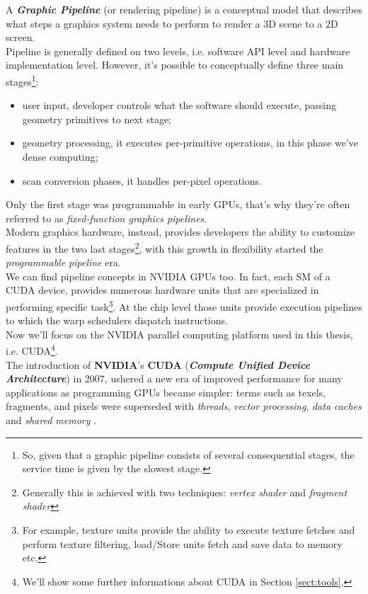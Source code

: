 	A \textit{\textbf{Graphic Pipeline}} (or rendering pipeline) is a conceptual model that describes what steps a graphics system needs to perform to render a 3D scene to a 2D screen\cite{pipemicrosoft}.\\
	
	Pipeline is generally defined on two levels, i.e. software API level and hardware implementation level. However, it's possible to conceptually define three main stages\footnote{So, given that a graphic pipeline consists of several consequential stages, the service time is given by the slowest stage.}:
	\begin{itemize}
		\item user input, developer controls what the software should execute, passing geometry primitives to next stage;
		\item geometry processing, it executes per-primitive operations, in this phase we've dense computing;
		\item scan conversion phases, it handles per-pixel operations.
	\end{itemize} 
	Only the first stage was programmable in early GPUs, that's why they're often referred to as \textit{fixed-function graphics pipelines}.\\
	Modern graphics hardware, instead, provides developers the ability to customize features in the two last stages\footnote{Generally this is achieved with two techniques: \textit{vertex shader} and \textit{fragment shader}}, with this growth in flexibility started the \textit{programmable pipeline} era\cite{rendering}.\\
	
	We can find pipeline concepts in NVIDIA GPUs too. In fact, each SM of a CUDA device, provides numerous hardware units that are specialized in performing specific task\footnote{For example, texture units provide the ability to execute texture fetches and perform texture filtering, load/Store units fetch and save data to memory etc.}. At the chip level those units provide execution pipelines to which the warp schedulers dispatch instructions\cite{cudapipe}.\\
	Now we'll focus on the NVIDIA parallel computing platform used in this thesis, i.e. CUDA\footnote{We'll show some further informations about CUDA in Section \ref{sect:tools}.}.\\
	The introduction of \textbf{NVIDIA}'s \textbf{CUDA} (\textbf{\textit{Compute Unified Device Architecture}}) in 2007, ushered a new era of improved performance for many applications as programming GPUs became simpler: terms such as texels, fragments, and pixels were superseded with \textit{threads}, \textit{vector processing}, \textit{data caches} and \textit{shared memory} \cite{fromCUtoOCL}. \\
	
